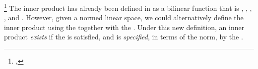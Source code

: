 \begin{remark}
\footnote{
  ,
  }
The inner product has already been defined in  as a bilinear function that
is , , , , and .
However, given a normed linear space, we could alternatively define the inner product using
the   together with
the  .
Under this new definition, an inner product \emph{exists} if the  is satisfied,
and is \emph{specified}, in terms of the norm, by the .
\end{remark}

